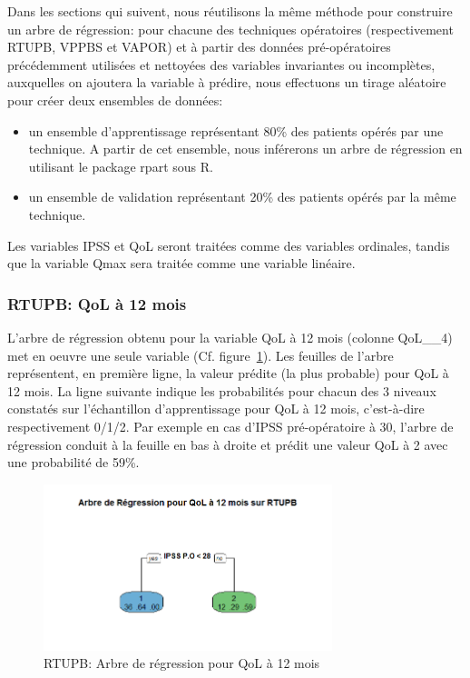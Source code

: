 %
%

%


Dans les sections qui suivent, nous réutilisons la même méthode pour construire un arbre de régression:
pour chacune des techniques opératoires (respectivement RTUPB, VPPBS et VAPOR) et à partir des données pré-opératoires précédemment utilisées et nettoyées des variables invariantes ou incomplètes, auxquelles on ajoutera
la variable à prédire, nous effectuons un tirage aléatoire pour créer deux ensembles de données:
\begin{itemize}
\item un ensemble d'apprentissage représentant 80\% des patients opérés par une technique. A partir de cet ensemble, nous inférerons un arbre de régression en utilisant le package rpart sous R.
\item un ensemble de validation représentant 20\% des patients opérés par la même technique.
\end{itemize}
Les variables IPSS et QoL seront traitées comme des variables ordinales, tandis que la variable Qmax sera
traitée comme une variable linéaire.

\subsubsection{RTUPB: QoL à 12 mois}

L'arbre de régression obtenu pour la variable QoL à 12 mois (colonne QoL__4) met en oeuvre une seule variable (Cf. figure~\ref{fig-rtupb-regtree-qol12}). Les feuilles de l'arbre représentent, en première ligne, la valeur prédite (la plus probable) pour QoL à 12 mois. La ligne suivante indique les probabilités pour chacun des 3 niveaux constatés sur l'échantillon d'apprentissage pour QoL à 12 mois, c'est-à-dire respectivement 0/1/2. Par exemple en cas d'IPSS pré-opératoire à 30, l'arbre de régression conduit à la feuille en bas à droite et prédit une valeur QoL à 2 avec une probabilité de 59\%.

\begin{figure}[H]
\centering
\includegraphics[width=0.75\textwidth]{../Fig/RTUPB/rtupb-regtree-qol12.png}
\caption{RTUPB: Arbre de régression pour QoL à 12 mois}
\label{fig-rtupb-regtree-qol12}
\end{figure}

